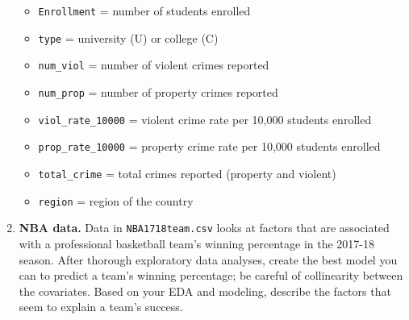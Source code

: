 \documentclass[
]{krantz}
\providecommand{\tightlist}{%
  \setlength{\itemsep}{0pt}\setlength{\parskip}{0pt}}
\begin{document}
\begin{enumerate}
  \begin{itemize}
  \tightlist
  \item
    \texttt{Enrollment} = number of students enrolled
  \item
    \texttt{type} = university (U) or college (C)
  \item
    \texttt{num\_viol} = number of violent crimes reported
  \item
    \texttt{num\_prop} = number of property crimes reported
  \item
    \texttt{viol\_rate\_10000} = violent crime rate per 10,000 students enrolled
  \item
    \texttt{prop\_rate\_10000} = property crime rate per 10,000 students enrolled
  \item
    \texttt{total\_crime} = total crimes reported (property and violent)
  \item
    \texttt{region} = region of the country
  \end{itemize}
\item
  \textbf{NBA data.} Data in \texttt{NBA1718team.csv} \citep{rossotti} looks at factors that are associated with a professional basketball team's winning percentage in the 2017-18 season. After thorough exploratory data analyses, create the best model you can to predict a team's winning percentage; be careful of collinearity between the covariates. Based on your EDA and modeling, describe the factors that seem to explain a team's success.


\end{enumerate}
\end{document}
